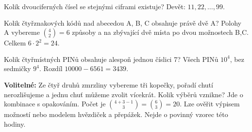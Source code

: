 \documentclass[11pt,a4paper]{article}
\begin{document}
\begin{zadaniReseniBox}[title={Samostatná práce 2}]
Kolik dvouciferných čísel se stejnými ciframi existuje?
\tcblower
Devět: $11,22,\ldots,99$.
\end{zadaniReseniBox}



\begin{zadaniReseniBox}[title={Samostatná práce 3}]
Kolik čtyřznakových kódů nad abecedou A, B, C obsahuje právě dvě A?
\tcblower
Polohy A vybereme $\binom42=6$ způsoby a na zbývající dvě místa po dvou možnostech B,C. Celkem $6\cdot2^2=24$.
\end{zadaniReseniBox}




\begin{zadaniReseniBox}[title={Rozšíření 1}]
Kolik čtyřmístných PINů obsahuje alespoň jednou číslici 7?
\tcblower
Všech PINů $10^4$, bez sedmičky $9^4$. Rozdíl $10000-6561=3439$.
\end{zadaniReseniBox}



\begin{zadaniReseniBox}[title={Rozšíření 2}]
\textbf{Volitelné:} Ze čtyř druhů zmrzliny vybereme tři kopečky, pořadí chutí nerozlišujeme a jednu chuť můžeme zvolit vícekrát. Kolik výběrů vznikne?
\tcblower
Jde o kombinace s opakováním. Počet je $\binom{4+3-1}{3}=\binom63=20$. Lze ověřit výpisem možností nebo modelem hvězdiček a přepážek. Nejde o povinný vzorec této hodiny.
\end{zadaniReseniBox}




\end{document}
